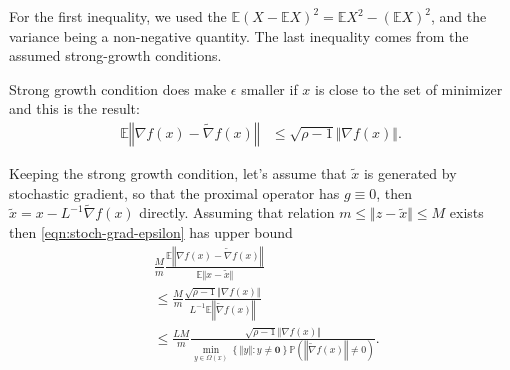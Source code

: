 \documentclass[12pt]{article}
\newcommand{\expect}{\ensuremath{\mathbb E}}
\newcommand{\prob}{\ensuremath{\mathbb P}}
\begin{document}
        For the first inequality, we used the $\expect (X - \expect X)^2 = \expect X^2 - (\expect X)^2$, and the variance being a non-negative quantity. 
        The last inequality comes from the assumed strong-growth conditions.
        \par
        Strong growth condition does make $\epsilon$ smaller if $x$ is close to the set of minimizer and this is the result: 
        \begin{align*}
            \expect \left\Vert
                \nabla f(x) - \tilde \nabla f(x)
            \right\Vert &\le 
            \sqrt{\rho - 1} \Vert \nabla f(x)\Vert. 
        \end{align*}
        \par
        Keeping the strong growth condition, let's assume that $\tilde x$ is generated by stochastic gradient, so that the proximal operator has $g \equiv 0$, then $\tilde x = x - L^{-1}\tilde \nabla f (x)$ directly. 
        Assuming that relation $m \le \Vert z - \tilde x\Vert \le M$ exists then \eqref{eqn:stoch-grad-epsilon} has upper bound
        \begin{align*}
            & \frac{M}{m} \frac{\expect\left\Vert \nabla f(x) - \tilde \nabla f(x)\right\Vert}{\expect \Vert x - \tilde x\Vert}
            \\
            &\le \frac{M}{m}\frac{\sqrt{\rho - 1}\Vert \nabla f(x)\Vert}{L^{-1}\expect \left\Vert\tilde \nabla f(x)\right\Vert}
            \\
            &\le \frac{LM}{m}
            \frac{\sqrt{\rho - 1}\Vert \nabla f(x)\Vert}{
                \min_{y \in \Omega(x)}\left\{
                    \left\Vert y \right\Vert: y\neq \mathbf 0
                \right\}\prob\left(\left\Vert\tilde \nabla f(x)\right\Vert \neq 0\right)
            }. 
        \end{align*}
\end{document}
